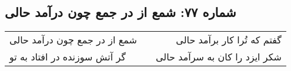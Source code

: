\begin{center}
\section*{شماره ۷۷: شمع از در جمع چون درآمد حالی}
\label{sec:077}
\begin{longtable}{l p{0.5cm} r}
شمع از در جمع چون درآمد حالی
&&
گفتم که تُرا کار برآمد حالی
\\
گر آتش سوزنده در افتاد به تو
&&
شکر ایزد را کان به سرآمد حالی
\\
\end{longtable}
\end{center}
